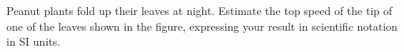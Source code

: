  Peanut plants fold up their leaves at night. Estimate
the top speed of the tip of one of the leaves shown in the
figure, expressing your result in scientific notation in SI units. \answercheck
